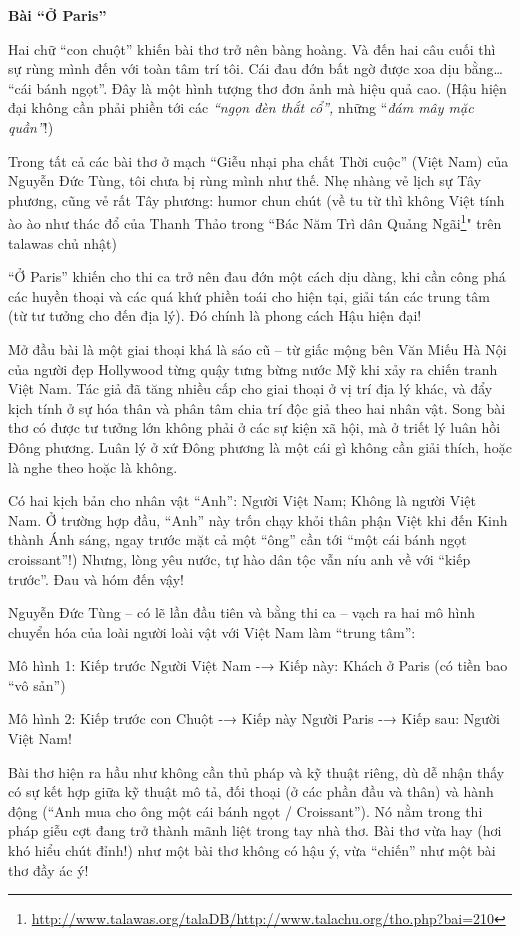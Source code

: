 \documentclass[../main.tex]{subfiles}
\begin{document}
\begin{multicols}{2}
 
\textbf{Bài “Ở Paris”} 
 
Hai chữ “con chuột” khiến bài thơ trở nên bàng hoàng. Và đến hai câu cuối thì sự rùng mình đến với toàn tâm trí tôi. Cái đau đớn bất ngờ được xoa dịu bằng… “cái bánh ngọt”. Đây là một hình tượng thơ đơn ảnh mà hiệu quả cao. (Hậu hiện đại không cần phải phiền tới các \textit{“ngọn đèn thắt cổ”, }những “\textit{đám mây mặc quần”}!) 
 
Trong tất cả các bài thơ ở mạch “Giễu nhại pha chất Thời cuộc” (Việt Nam) của Nguyễn Đức Tùng, tôi chưa bị rùng mình như thế. Nhẹ nhàng vẻ lịch sự Tây phương, cũng vẻ rất Tây phương: humor chun chút (về tu từ thì không Việt tính ào ào như thác đổ của Thanh Thảo trong “Bác Năm Trì dân Quảng Ngãi\footnote{\url{http://www.talawas.org/talaDB/http://www.talachu.org/tho.php?bai=210}}" trên talawas chủ nhật) 
 
“Ở Paris” khiến cho thi ca trở nên đau đớn một cách dịu dàng, khi cần công phá các huyền thoại và các quá khứ phiền toái cho hiện tại, giải tán các trung tâm (từ tư tưởng cho đến địa lý). Đó chính là phong cách Hậu hiện đại!  
 
Mở đầu bài là một giai thoại khá là sáo cũ – từ giấc mộng bên Văn Miếu Hà Nội của người đẹp Hollywood từng quậy tưng bừng nước Mỹ khi xảy ra chiến tranh Việt Nam. Tác giả đã tăng nhiều cấp cho giai thoại ở vị trí địa lý khác, và đẩy kịch tính ở sự hóa thân và phân tâm chia trí độc giả theo hai nhân vật. Song bài thơ có được tư tưởng lớn không phải ở các sự kiện xã hội, mà ở triết lý luân hồi Đông phương. Luân lý ở xứ Đông phương là một cái gì không cần giải thích, hoặc là nghe theo hoặc là không.  
 
Có hai kịch bản cho nhân vật “Anh”: Người Việt Nam; Không là người Việt Nam. Ở trường hợp đầu, “Anh” này trốn chạy khỏi thân phận Việt khi đến Kinh thành Ánh sáng, ngay trước mặt cả một “ông” cần tới “một cái bánh ngọt croissant”!) Nhưng, lòng yêu nước, tự hào dân tộc vẫn níu anh về với “kiếp trước”. Đau và hóm đến vậy! 
 
Nguyễn Đức Tùng – có lẽ lần đầu tiên và bằng thi ca – vạch ra hai mô hình chuyển hóa của loài người loài vật với Việt Nam làm “trung tâm”: 
 
Mô hình 1: Kiếp trước Người Việt Nam -→ Kiếp này: Khách ở Paris (có tiền bao “vô sản”) 
 
Mô hình 2: Kiếp trước con Chuột -→ Kiếp này Người Paris -→ Kiếp sau: Người Việt Nam! 
 
Bài thơ hiện ra hầu như không cần thủ pháp và kỹ thuật riêng, dù dễ nhận thấy có sự kết hợp giữa kỹ thuật mô tả, đối thoại (ở các phần đầu và thân) và hành động (“Anh mua cho ông một cái bánh ngọt / Croissant”). Nó nằm trong thi pháp giễu cợt đang trở thành mãnh liệt trong tay nhà thơ. Bài thơ vừa hay (hơi khó hiểu chút đỉnh!) như một bài thơ không có hậu ý, vừa “chiến” như một bài thơ đầy ác ý! 
 

\end{multicols}
\end{document}

